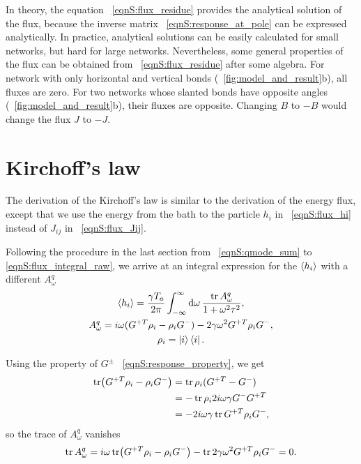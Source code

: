 \documentclass[
 amsmath,amssymb,
 aps,
 pre,
 longbibliography,
 10pt, onecolumn,
 notitlepage
]{revtex4-1}
\begin{document}
In theory, the equation \eqnname~\eqref{eqnS:flux_residue} provides the analytical solution of the flux, because the inverse matrix \eqnname~\eqref{eqnS:response_at_pole} can be expressed analytically.
In practice, analytical solutions can be easily calculated for small networks, but hard for large networks.
Nevertheless, some general properties of the flux can be obtained from \eqnname~\eqref{eqnS:flux_residue} after some algebra. For network with only horizontal and vertical bonds (\figurename~\ref{fig:model_and_result}b), all fluxes are zero. For two networks whose slanted bonds have opposite angles (\figurename~\ref{fig:model_and_result}b), their fluxes are opposite. Changing $B$ to $-B$ would change the flux $J$ to $-J$.


\section{Kirchoff's law}
The derivation of the Kirchoff's law is similar to the derivation of the energy flux, except that we use the energy from the bath to the particle $h_i$ in \eqnname~\eqref{eqnS:flux_hi} instead of $J_{ij}$ in \eqnname~\eqref{eqnS:flux_Jij}.

Following the procedure in the last section from \eqnname~\eqref{eqnS:qmode_sum} to \eqref{eqnS:flux_integral_raw}, we arrive at an integral expression for the $\expval{h_i}$ with a different $A_\omega^q$
\begin{gather}
    \expval{h_i} = \frac{\gamma T_a}{2\pi} \int_{-\infty}^{\infty} \dd{\omega} \frac{\tr A_\omega^q}{1+\omega^2\tau^2}, \label{eqnS:flux_hi_fourier}\\
    A_\omega^q = i\omega (G^{+T} \rho_i - \rho_iG^-) - 2\gamma\omega^2 G^{+T} \rho_i G^- ,\\
    \rho_i = \ket{i}\bra{i} .
\end{gather}

Using the property of $G^\pm$ \eqnname~\eqref{eqnS:response_property}, we get
\begin{equation}
    \begin{split}
        \tr (G^{+T} \rho_i - \rho_iG^-)
        &= \tr \rho_i(G^{+T} - G^-) \\
        &= -\tr \rho_i 2i\omega \gamma G^- G^{+T} \\
        &= -2i\omega\gamma \tr G^{+T}\rho_i G^- ,
    \end{split}
\end{equation}
so the trace of $A_\omega^q$ vanishes
\begin{equation}
    \tr A_\omega^q
    = i\omega \tr (G^{+T} \rho_i - \rho_iG^-) - \tr 2\gamma\omega^2 G^{+T} \rho_i G^-
    = 0 .
\end{equation}
\end{document}
